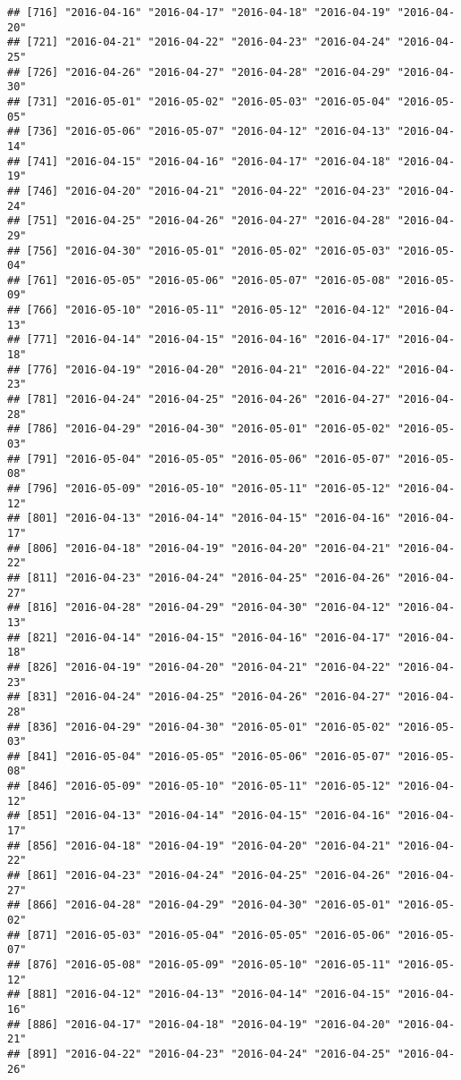 \documentclass[
]{article}
\begin{document}
\begin{verbatim}
## [716] "2016-04-16" "2016-04-17" "2016-04-18" "2016-04-19" "2016-04-20"
## [721] "2016-04-21" "2016-04-22" "2016-04-23" "2016-04-24" "2016-04-25"
## [726] "2016-04-26" "2016-04-27" "2016-04-28" "2016-04-29" "2016-04-30"
## [731] "2016-05-01" "2016-05-02" "2016-05-03" "2016-05-04" "2016-05-05"
## [736] "2016-05-06" "2016-05-07" "2016-04-12" "2016-04-13" "2016-04-14"
## [741] "2016-04-15" "2016-04-16" "2016-04-17" "2016-04-18" "2016-04-19"
## [746] "2016-04-20" "2016-04-21" "2016-04-22" "2016-04-23" "2016-04-24"
## [751] "2016-04-25" "2016-04-26" "2016-04-27" "2016-04-28" "2016-04-29"
## [756] "2016-04-30" "2016-05-01" "2016-05-02" "2016-05-03" "2016-05-04"
## [761] "2016-05-05" "2016-05-06" "2016-05-07" "2016-05-08" "2016-05-09"
## [766] "2016-05-10" "2016-05-11" "2016-05-12" "2016-04-12" "2016-04-13"
## [771] "2016-04-14" "2016-04-15" "2016-04-16" "2016-04-17" "2016-04-18"
## [776] "2016-04-19" "2016-04-20" "2016-04-21" "2016-04-22" "2016-04-23"
## [781] "2016-04-24" "2016-04-25" "2016-04-26" "2016-04-27" "2016-04-28"
## [786] "2016-04-29" "2016-04-30" "2016-05-01" "2016-05-02" "2016-05-03"
## [791] "2016-05-04" "2016-05-05" "2016-05-06" "2016-05-07" "2016-05-08"
## [796] "2016-05-09" "2016-05-10" "2016-05-11" "2016-05-12" "2016-04-12"
## [801] "2016-04-13" "2016-04-14" "2016-04-15" "2016-04-16" "2016-04-17"
## [806] "2016-04-18" "2016-04-19" "2016-04-20" "2016-04-21" "2016-04-22"
## [811] "2016-04-23" "2016-04-24" "2016-04-25" "2016-04-26" "2016-04-27"
## [816] "2016-04-28" "2016-04-29" "2016-04-30" "2016-04-12" "2016-04-13"
## [821] "2016-04-14" "2016-04-15" "2016-04-16" "2016-04-17" "2016-04-18"
## [826] "2016-04-19" "2016-04-20" "2016-04-21" "2016-04-22" "2016-04-23"
## [831] "2016-04-24" "2016-04-25" "2016-04-26" "2016-04-27" "2016-04-28"
## [836] "2016-04-29" "2016-04-30" "2016-05-01" "2016-05-02" "2016-05-03"
## [841] "2016-05-04" "2016-05-05" "2016-05-06" "2016-05-07" "2016-05-08"
## [846] "2016-05-09" "2016-05-10" "2016-05-11" "2016-05-12" "2016-04-12"
## [851] "2016-04-13" "2016-04-14" "2016-04-15" "2016-04-16" "2016-04-17"
## [856] "2016-04-18" "2016-04-19" "2016-04-20" "2016-04-21" "2016-04-22"
## [861] "2016-04-23" "2016-04-24" "2016-04-25" "2016-04-26" "2016-04-27"
## [866] "2016-04-28" "2016-04-29" "2016-04-30" "2016-05-01" "2016-05-02"
## [871] "2016-05-03" "2016-05-04" "2016-05-05" "2016-05-06" "2016-05-07"
## [876] "2016-05-08" "2016-05-09" "2016-05-10" "2016-05-11" "2016-05-12"
## [881] "2016-04-12" "2016-04-13" "2016-04-14" "2016-04-15" "2016-04-16"
## [886] "2016-04-17" "2016-04-18" "2016-04-19" "2016-04-20" "2016-04-21"
## [891] "2016-04-22" "2016-04-23" "2016-04-24" "2016-04-25" "2016-04-26"

\end{verbatim}
\end{document}
